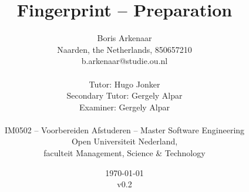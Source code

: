 \title{Fingerprint -- Preparation}
\author{
  Boris Arkenaar\\
  Naarden, the Netherlands, 850657210\\
  b.arkenaar@studie.ou.nl\\
  \\
  Tutor: Hugo Jonker\\
  Secondary Tutor: Gergely Alpar\\
  Examiner: Gergely Alpar\\
  \\
  IM0502 -- Voorbereiden Afstuderen -- Master Software Engineering\\
  Open Universiteit Nederland,\\
  faculteit Management, Science \& Technology}
\date{\today\\v0.2}
\maketitle
